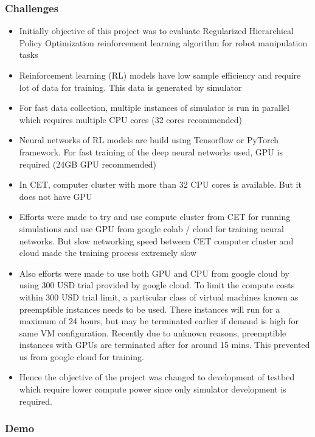 \documentclass{beamer}
\begin{document}
	\begin{frame}[allowframebreaks]
		\frametitle{Challenges}
		
		\begin{itemize}
			\item Initially objective of this project was to evaluate Regularized Hierarchical Policy Optimization reinforcement learning algorithm for robot manipulation tasks
			\item Reinforcement learning (RL) models have low sample efficiency and require lot of data for training. This data is generated by simulator
			\item For fast data collection, multiple instances of simulator is run in parallel which requires multiple CPU cores (32 cores recommended)
			\item Neural networks of RL models are build using Tensorflow or PyTorch framework. For fast training of the deep neural networks used, GPU is required (24GB GPU recommended)
			\item In CET, computer cluster with more than 32 CPU cores is available. But it does not have GPU
			\item Efforts were made to try and use compute cluster from CET for running simulations and use GPU from google colab / cloud for training neural networks. But slow networking speed between CET computer cluster and cloud made the training process extremely slow
			\item Also efforts were made to use both GPU and CPU from google cloud by using 300 USD trial provided by google cloud. To limit the compute costs within 300 USD trial limit, a particular class of virtual machines known as preemptible instances needs to be used. These instances will run for a maximum of 24 hours, but may be terminated earlier if demand is high for same VM configuration. Recently due to unknown reasons, preemptible instances with GPUs are terminated after for around 15 mins. This prevented us from google cloud for training.
			\item Hence the objective of the project was changed to development of testbed which require lower compute power since only simulator development is required.
		\end{itemize}
	\end{frame}

	\begin{frame}
		\frametitle{Demo}
		
		\begin{center}
		\end{center}
	\end{frame}
\end{document}
